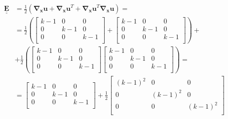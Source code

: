 \documentclass
[
a4paper,                      %
twoside,					  %
12pt,                         %
abstract,		      %
fleqn,                        %
]
{scrartcl} %
\begin{document}
\begin{equation}
\begin{aligned}
\mathbf{\underline{\underline{E}}}&=\frac{1}{2}\left(\mathbf{\nabla_{x}u}+\mathbf{\nabla_{x}u}^{T}+\mathbf{\nabla_{x}u}^{T}\mathbf{\nabla_{x}u}\right)=\\
&=\frac{1}{2}\left(\begin{bmatrix}
k-1&0&0\\[5pt]
0&k-1&0\\[5pt]
0&0&k-1\\[5pt]\end{bmatrix}+\begin{bmatrix}
k-1&0&0\\[5pt]
0&k-1&0\\[5pt]
0&0&k-1\\[5pt]\end{bmatrix}\right)+\\
&+\frac{1}{2}\left(\begin{bmatrix}
k-1&0&0\\[5pt]
0&k-1&0\\[5pt]
0&0&k-1\\[5pt]\end{bmatrix}\begin{bmatrix}
k-1&0&0\\[5pt]
0&k-1&0\\[5pt]
0&0&k-1\\[5pt]\end{bmatrix}\right)=\\
&=\begin{bmatrix}
k-1&0&0\\[5pt]
0&k-1&0\\[5pt]
0&0&k-1\\[5pt]\end{bmatrix}+\frac{1}{2}\begin{bmatrix}
\left(k-1\right)^{2}&0&0\\[5pt]
0&\left(k-1\right)^{2}&0\\[5pt]
0&0&\left(k-1\right)^{2}\\[5pt]\end{bmatrix}
\end{aligned}
\end{equation}
\end{document}
